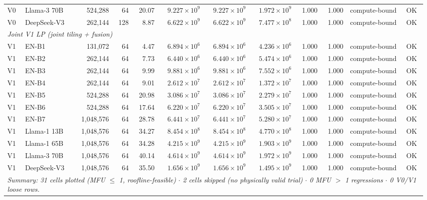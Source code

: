\begin{table}[ht!]
{\begin{tabular}{llrrrrrrrrll}
V0 & Llama-3 70B & 524{,}288 & 64  & 20.07 & $9.227\times10^{9}$ & $9.227\times10^{9}$ & $1.972\times10^{9}$ & 1.000 & 1.000 & compute-bound & OK \\
V0 & DeepSeek-V3 & 262{,}144 & 128 &  8.87 & $6.622\times10^{9}$ & $6.622\times10^{9}$ & $7.477\times10^{8}$ & 1.000 & 1.000 & compute-bound & OK \\
\midrule
\multicolumn{12}{l}{\textit{Joint V1 LP (joint tiling + fusion)}} \\
\midrule
V1 & EN-B1       &    131{,}072 & 64 &  4.47 & $6.894\times10^{6}$ & $6.894\times10^{6}$ & $4.236\times10^{6}$ & 1.000 & 1.000 & compute-bound & OK \\
V1 & EN-B2       &    262{,}144 & 64 &  7.73 & $6.440\times10^{6}$ & $6.440\times10^{6}$ & $5.474\times10^{6}$ & 1.000 & 1.000 & compute-bound & OK \\
V1 & EN-B3       &    262{,}144 & 64 &  9.99 & $9.881\times10^{6}$ & $9.881\times10^{6}$ & $7.552\times10^{6}$ & 1.000 & 1.000 & compute-bound & OK \\
V1 & EN-B4       &    262{,}144 & 64 &  9.01 & $2.612\times10^{7}$ & $2.612\times10^{7}$ & $1.372\times10^{7}$ & 1.000 & 1.000 & compute-bound & OK \\
V1 & EN-B5       &    524{,}288 & 64 & 20.98 & $3.086\times10^{7}$ & $3.086\times10^{7}$ & $2.279\times10^{7}$ & 1.000 & 1.000 & compute-bound & OK \\
V1 & EN-B6       &    524{,}288 & 64 & 17.64 & $6.220\times10^{7}$ & $6.220\times10^{7}$ & $3.505\times10^{7}$ & 1.000 & 1.000 & compute-bound & OK \\
V1 & EN-B7       & 1{,}048{,}576 & 64 & 28.78 & $6.441\times10^{7}$ & $6.441\times10^{7}$ & $5.280\times10^{7}$ & 1.000 & 1.000 & compute-bound & OK \\
V1 & Llama-1 13B & 1{,}048{,}576 & 64 & 34.27 & $8.454\times10^{8}$ & $8.454\times10^{8}$ & $4.770\times10^{8}$ & 1.000 & 1.000 & compute-bound & OK \\
V1 & Llama-1 65B & 1{,}048{,}576 & 64 & 34.28 & $4.215\times10^{9}$ & $4.215\times10^{9}$ & $1.903\times10^{9}$ & 1.000 & 1.000 & compute-bound & OK \\
V1 & Llama-3 70B & 1{,}048{,}576 & 64 & 40.14 & $4.614\times10^{9}$ & $4.614\times10^{9}$ & $1.972\times10^{9}$ & 1.000 & 1.000 & compute-bound & OK \\
V1 & DeepSeek-V3 & 1{,}048{,}576 & 64 & 35.50 & $1.656\times10^{9}$ & $1.656\times10^{9}$ & $1.495\times10^{9}$ & 1.000 & 1.000 & compute-bound & OK \\
\midrule
\multicolumn{12}{l}{%
\textit{Summary: 31 cells plotted (MFU $\leq$ 1, roofline-feasible) $\cdot$
2 cells skipped (no physically valid trial) $\cdot$
0 MFU $>$ 1 regressions $\cdot$
0 V0/V1 loose rows.}}\\
\bottomrule
\end{tabular}%
}
\end{table}



